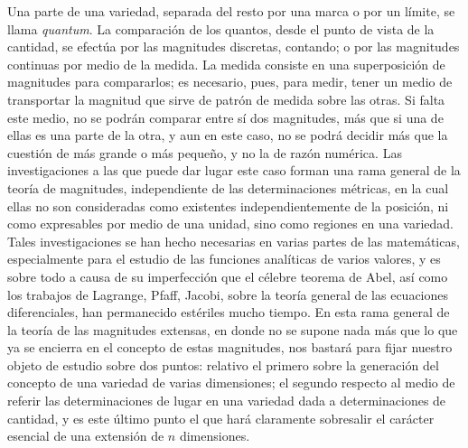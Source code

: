 \documentclass[a4paper, 12pt]{article}
\begin{document}
Una parte de una variedad, separada del resto por una marca o por un límite, se llama \textit{quantum}. La comparación de los quantos, desde el punto de vista de la cantidad, se efectúa por las magnitudes discretas, contando; o por las magnitudes continuas por medio de la medida. La medida consiste en una superposición de magnitudes para compararlos; es necesario, pues, para medir, tener un medio de transportar la magnitud que sirve de patrón de medida sobre las otras. Si falta este medio, no se podrán comparar entre sí dos magnitudes, más que si una de ellas es una parte de la otra, y aun en este caso, no se podrá decidir más que la cuestión de más grande o más pequeño, y no la de razón numérica. Las investigaciones a las que puede dar lugar este caso forman una rama general de la teoría de magnitudes, independiente de las determinaciones métricas, en la cual ellas no son consideradas como existentes independientemente de la posición, ni  como expresables por medio de una unidad, sino como regiones en una variedad. Tales investigaciones se han hecho necesarias en varias partes de las matemáticas, especialmente para el estudio de las funciones analíticas de varios valores, y es sobre todo a causa de su imperfección que el célebre teorema de Abel, así como los trabajos de Lagrange, Pfaff, Jacobi, sobre la teoría general de las ecuaciones diferenciales, han permanecido estériles mucho tiempo. En esta rama general de la teoría de las magnitudes extensas, en donde no se supone nada más que lo que ya se encierra en el concepto de estas magnitudes, nos bastará para fijar nuestro objeto de estudio sobre dos puntos: relativo el primero sobre la generación del concepto de una variedad de varias dimensiones; el segundo respecto al medio de referir las determinaciones de lugar en una variedad dada a determinaciones de cantidad, y es este último punto el que hará claramente sobresalir el carácter esencial de una extensión de $n$ dimensiones.
   
\bigskip
\end{document}
